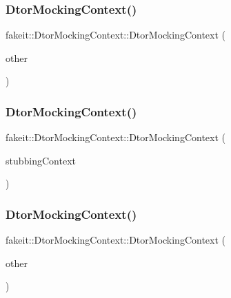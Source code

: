 \subsubsection{\texorpdfstring{DtorMockingContext()}{DtorMockingContext()}\hspace{0.1cm}{\footnotesize\ttfamily [15/27]}}
{\footnotesize\ttfamily fakeit\+::\+Dtor\+Mocking\+Context\+::\+Dtor\+Mocking\+Context (\begin{DoxyParamCaption}\item[{\mbox{\hyperlink{classfakeit_1_1DtorMockingContext}{Dtor\+Mocking\+Context}} \&\&}]{other }\end{DoxyParamCaption})\hspace{0.3cm}{\ttfamily [inline]}}

\mbox{\label{classfakeit_1_1DtorMockingContext_a81c785463a44f396c4c3e5e0e1c9e40d}} 
\subsubsection{\texorpdfstring{DtorMockingContext()}{DtorMockingContext()}\hspace{0.1cm}{\footnotesize\ttfamily [16/27]}}
{\footnotesize\ttfamily fakeit\+::\+Dtor\+Mocking\+Context\+::\+Dtor\+Mocking\+Context (\begin{DoxyParamCaption}\item[{\mbox{\hyperlink{classfakeit_1_1MethodMockingContext}{Method\+Mocking\+Context}}$<$ void $>$\+::Context $\ast$}]{stubbing\+Context }\end{DoxyParamCaption})\hspace{0.3cm}{\ttfamily [inline]}}

\mbox{\label{classfakeit_1_1DtorMockingContext_a03939798c9836d082d94fe4e84d3dcd3}} 
\subsubsection{\texorpdfstring{DtorMockingContext()}{DtorMockingContext()}\hspace{0.1cm}{\footnotesize\ttfamily [17/27]}}
{\footnotesize\ttfamily fakeit\+::\+Dtor\+Mocking\+Context\+::\+Dtor\+Mocking\+Context (\begin{DoxyParamCaption}\item[{\mbox{\hyperlink{classfakeit_1_1DtorMockingContext}{Dtor\+Mocking\+Context}} \&}]{other }\end{DoxyParamCaption})\hspace{0.3cm}{\ttfamily [inline]}}

